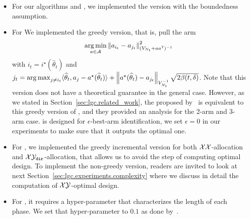 \begin{itemize}
	\item For our algorithms \LG and \LGC, we implemented the version with the boundedness assumption.
	\item For \LGapE We implemented the greedy version, that is, pull the arm 
	\[
	    \operatorname*{arg\,min}_{a\in\mathcal{A}} \left\lVert a_{i_t}-a_{j_t}\right\rVert_{(V_{N_t}+aa^{\mathsf{\scriptscriptstyle T}})^{-1}}^2
	\]
	with $i_t = i^\star(\hat\theta_t)$ and $j_t = \operatorname*{arg\,max}_{j\neq i_t}\langle\widehat\theta_t,a_{j}-a^\star(\widehat\theta_t)\rangle + \left\lVert a^\star(\widehat\theta_t) - a_{j_t}\right\rVert_{V_{N_t}^{-1}} \sqrt{2\beta(t,\delta)}$. Note that this version does not have a theoretical guarantee in the general case. However, as we stated in Section~\ref{sec:lgc.related_work}, the \GLUCB proposed by~\citet{zaki2019maxoverlap} is equivalent to this greedy version of \LGapE, and they provided an analysis for the 2-arm and 3-arm case. \LGapE is designed for $\epsilon$-best-arm identification, we set $\epsilon=0$ in our experiments to make sure that it outputs the optimal one.
	\item For \XYS, we implemented the greedy incremental version for both $\mathcal{X}\mathcal{X}$-allocation and $\mathcal{X}\mathcal{Y}_{\texttt{dir}}$-allocation, that allows us to avoid the step of computing optimal design. To implement the non-greedy version, readers are invited to look at next Section~\ref{sec:lgc.experiments.complexity} where we discuss in detail the computation of $\mathcal{X}\mathcal{Y}$-optimal design.
	\item For \XYA, it requires a hyper-parameter that characterizes the length of each phase. We set that hyper-parameter to $0.1$ as done by~\citet{soare2014linear}.
\end{itemize}



